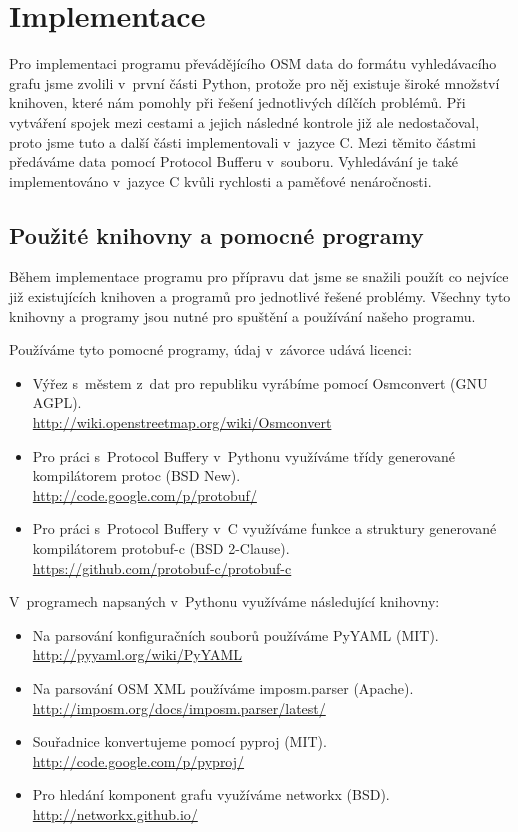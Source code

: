 \chapter{Implementace}
Pro implementaci programu převádějícího OSM data do formátu vyhledávacího grafu
jsme zvolili v~první části Python, protože pro něj existuje široké množství
knihoven, které nám pomohly při řešení jednotlivých dílčích problémů. Při
vytváření spojek mezi cestami a jejich následné kontrole již ale nedostačoval,
proto jsme tuto a další části implementovali v~jazyce C. Mezi těmito částmi
předáváme data pomocí Protocol Bufferu v~souboru. Vyhledávání je také
implementováno v~jazyce C kvůli rychlosti a paměťové nenáročnosti.

\section{Použité knihovny a pomocné programy}
Během implementace programu pro přípravu dat jsme se snažili použít co nejvíce
již existujících knihoven a programů pro jednotlivé řešené problémy. Všechny
tyto knihovny a programy jsou nutné pro spuštění a používání našeho programu. 

\medskip
\noindent Používáme tyto pomocné programy, údaj v~závorce udává licenci:
\begin{itemize}
	\item Výřez s~městem z~dat pro republiku vyrábíme pomocí {\tuc
	Osmconvert} (GNU AGPL).\\
	\url{http://wiki.openstreetmap.org/wiki/Osmconvert}
	\item Pro práci s~Protocol Buffery v~Pythonu využíváme třídy generované
	kompilátorem {\tuc protoc} (BSD New).\\
	\url{http://code.google.com/p/protobuf/}
	\item Pro práci s~Protocol Buffery v~C využíváme funkce a struktury
	generované kompilátorem {\tuc protobuf-c} (BSD 2-Clause).\\
	\url{https://github.com/protobuf-c/protobuf-c}
\end{itemize}

\noindent V~programech napsaných v~Pythonu využíváme následující knihovny:
\begin{itemize}
	\item Na parsování konfiguračních souborů používáme {\tuc PyYAML}
	(MIT).\\
	\url{http://pyyaml.org/wiki/PyYAML}
	\item Na parsování OSM XML používáme {\tuc imposm.parser} (Apache).\\
	\url{http://imposm.org/docs/imposm.parser/latest/}
	\item Souřadnice konvertujeme pomocí {\tuc pyproj} (MIT).\\
	\url{http://code.google.com/p/pyproj/}
	\item Pro hledání komponent grafu využíváme {\tuc networkx} (BSD).\\
	\url{http://networkx.github.io/}
\end{itemize}

